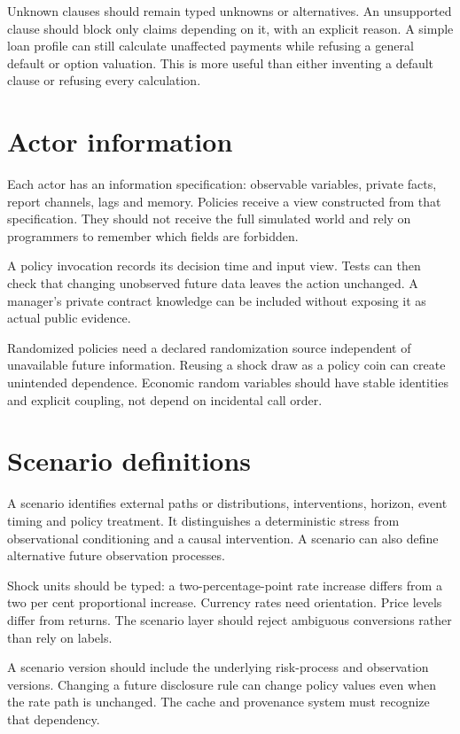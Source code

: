 Unknown clauses should remain typed unknowns or alternatives. An unsupported clause should block only claims depending on it, with an explicit reason. A simple loan profile can still calculate unaffected payments while refusing a general default or option valuation. This is more useful than either inventing a default clause or refusing every calculation.

\section{Actor information}
Each actor has an information specification: observable variables, private facts, report channels, lags and memory. Policies receive a view constructed from that specification. They should not receive the full simulated world and rely on programmers to remember which fields are forbidden.

A policy invocation records its decision time and input view. Tests can then check that changing unobserved future data leaves the action unchanged. A manager's private contract knowledge can be included without exposing it as actual public evidence.

Randomized policies need a declared randomization source independent of unavailable future information. Reusing a shock draw as a policy coin can create unintended dependence. Economic random variables should have stable identities and explicit coupling, not depend on incidental call order.

\section{Scenario definitions}
A scenario identifies external paths or distributions, interventions, horizon, event timing and policy treatment. It distinguishes a deterministic stress from observational conditioning and a causal intervention. A scenario can also define alternative future observation processes.

Shock units should be typed: a two-percentage-point rate increase differs from a two per cent proportional increase. Currency rates need orientation. Price levels differ from returns. The scenario layer should reject ambiguous conversions rather than rely on labels.

A scenario version should include the underlying risk-process and observation versions. Changing a future disclosure rule can change policy values even when the rate path is unchanged. The cache and provenance system must recognize that dependency.

